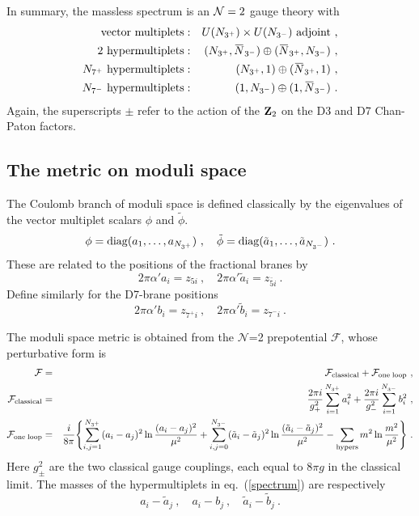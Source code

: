 \documentclass[a4paper,12pt]{article}
\renewcommand{\=}[1]{\bar{#1}}
\newcommand{\OL}[1]{ \hspace{1pt}\overline{\hspace{-1pt}#1
   \hspace{-1pt}}\hspace{1pt} }
\begin{document}
In summary, the massless spectrum is an ${\cal N}=2$ gauge theory with
\begin{eqnarray}
\mbox{vector multiplets}:&&U(N_{3^+}) \times U(N_{3^-})\mbox{ adjoint\
,}
\nonumber\\
2\mbox{ hypermultiplets}:&&(N_{3^+},\OL{N}_{3^-})\oplus
(\OL{N}_{3^+}, { N}_{3^-})\ ,
\nonumber\\
N_{7^+}\mbox{ hypermultiplets}:&&(N_{3^+},1)\oplus
(\OL{N}_{3^+},1)\ ,
\nonumber\\
N_{7^-}\mbox{ hypermultiplets}:&&(1,{N}_{3^-})\oplus
(1, \OL{ N}_{3^-})
\ . \label{spectrum}
\end{eqnarray}
Again, the superscripts $\pm$ refer to the action of the ${\bf Z}_2$ on the D3
and D7 Chan-Paton factors.

\subsection{The metric on moduli space}

The Coulomb branch of moduli space is defined classically by the eigenvalues of
the vector multiplet scalars $\phi$ and $\tilde\phi$.
\begin{equation}
\phi = {\rm diag}(a_1,\ldots,a_{N_{3^+}})\ ,\quad
\tilde\phi = {\rm diag}(\tilde a_1,\ldots,\tilde a_{N_{3^-}})\ .
\end{equation}
These are related to the positions of the fractional branes by
\begin{equation}
{2\pi\alpha'} a_i = {z_{5i}} \ ,\quad {2\pi\alpha'} \tilde a_i = {z_{\bar
5i}} \ .
\end{equation}
 Define similarly for the D7-brane positions
\begin{equation}
{2\pi\alpha'} b_i = {z_{7^+i}} \ ,\quad {2\pi\alpha'} \tilde b_i =
{z_{7^-i}} \ .
\end{equation}


The moduli space metric is obtained from the
$\mathcal N$=2 prepotential $\mathcal F$, whose perturbative form is
\begin{eqnarray}
{\mathcal F} &=& {\mathcal F}_{\rm classical} + {\mathcal F}_{\rm one\; loop}
\ ,
\nonumber\\
{\mathcal F}_{\rm classical} &=& \frac{2\pi i}{g^2_+}
\sum_{i=1}^{N_{3^+}} a_i^2
+
\frac{2\pi i}{g^2_-} \sum_{i=1}^{N_{3^-}} b_i^2 \ ,
\\
{\mathcal F}_{\rm one\; loop} &=&
\frac{i}{8\pi}\Biggl\{ \sum_{i , j =1}^{N_{3^+}}
(a_i-a_j)^2
\ln \frac{(a_i-a_j)^2}{\mu^2}
+ \sum_{i, j=0}^{N_{3^-}}(\tilde a_i-\tilde a_j)^2
\ln \frac{(\tilde a_i-\tilde a_j)^2}{\mu^2}
- \sum_{\rm hypers} m^2 \ln \frac{m^2}{\mu^2} \Biggr\}\ .\nonumber
\end{eqnarray}
Here $g^2_\pm$ are the two classical gauge couplings, each equal to
$8\pi g$ in the classical limit.
The masses of the hypermultiplets in eq.~(\ref{spectrum}) are respectively
\begin{equation}
a_i - \tilde a_j\ , \quad a_i - b_j\ ,\quad \tilde a_i - \tilde b_j
\ .
\end{equation}
\end{document}

